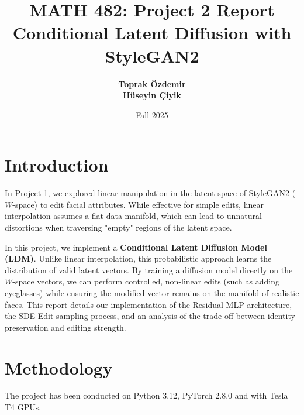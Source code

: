 \documentclass[12pt]{article}
\title{\textbf{MATH 482: Project 2 Report} \\ Conditional Latent Diffusion with StyleGAN2}
\author{
    \textbf{Toprak Özdemir} \\
    \textbf{Hüseyin Çiyik}
}
\date{Fall 2025}
\begin{document}
\maketitle
\tableofcontents
\newpage

\section{Introduction}
In Project 1, we explored linear manipulation in the latent space of StyleGAN2 ($W$-space) to edit facial attributes. While effective for simple edits, linear interpolation assumes a flat data manifold, which can lead to unnatural distortions when traversing "empty" regions of the latent space.

In this project, we implement a \textbf{Conditional Latent Diffusion Model (LDM)}. Unlike linear interpolation, this probabilistic approach learns the distribution of valid latent vectors. By training a diffusion model directly on the $W$-space vectors, we can perform controlled, non-linear edits (such as adding eyeglasses) while ensuring the modified vector remains on the manifold of realistic faces. This report details our implementation of the Residual MLP architecture, the SDE-Edit sampling process, and an analysis of the trade-off between identity preservation and editing strength.

\section{Methodology}
 The project has been conducted on Python 3.12, PyTorch 2.8.0 and with Tesla T4 GPUs.
\end{document}
